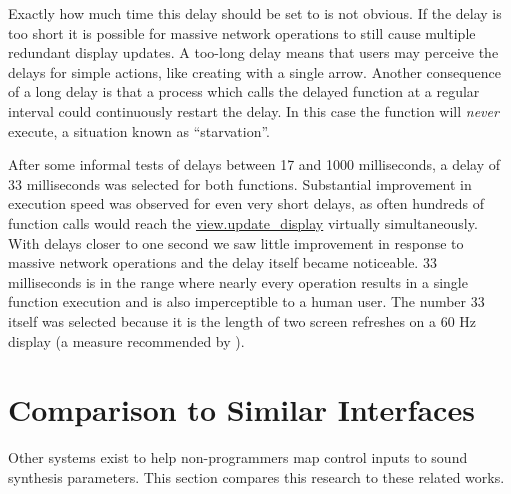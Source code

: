 
Exactly how much time this delay should be set to is not obvious. If the delay is too short it is possible for massive network operations to still cause multiple redundant display updates. A too-long delay means that users may perceive the delays for simple actions, like creating with a single arrow. Another consequence of a long delay is that a process which calls the delayed function at a regular interval could continuously restart the delay. In this case the function will \emph{never} execute, a situation known as ``starvation''.

After some informal tests of delays between 17 and 1000 milliseconds, a delay of 33 milliseconds was selected for both functions. Substantial improvement in execution speed was observed for even very short delays, as often hundreds of function calls would reach the \url{view.update_display} virtually simultaneously. With delays closer to one second we saw little improvement in response to massive network operations and the delay itself became noticeable. 33 milliseconds is in the range where nearly every operation results in a single function execution and is also imperceptible to a human user. The number 33 itself was selected because it is the length of two screen refreshes on a 60 Hz display (a measure recommended by ).
	


\section{Comparison to Similar Interfaces} %
\label{sec:comparison_to_similar_interfaces}

Other systems exist to help non-programmers map control inputs to sound synthesis parameters. This section compares this research to these related works.

